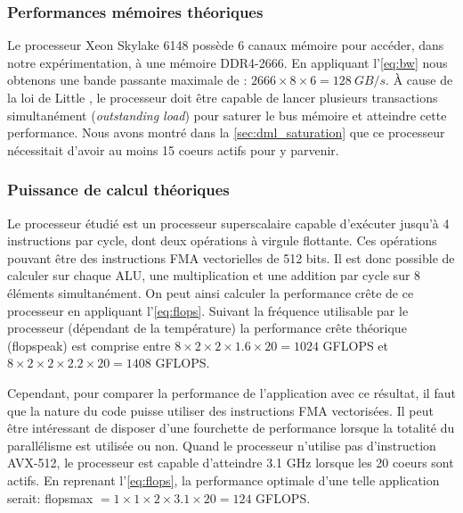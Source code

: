     
    

    \subsubsection{Performances mémoires théoriques}
        Le processeur Xeon Skylake 6148 possède 6 canaux mémoire pour accéder, dans notre expérimentation, à une mémoire DDR4-2666. En appliquant l'\autoref{eq:bw} nous obtenons une bande passante maximale de : $2666 \times 8 \times 6 = 128\ GB/s$. À cause de la loi de Little \cite{little2008little}, le processeur doit être capable de lancer plusieurs transactions simultanément (\textit{outstanding load}) pour saturer le bus mémoire et  atteindre cette performance. Nous avons montré dans la \autoref{sec:dml_saturation} que ce processeur nécessitait d'avoir au moins 15 coeurs actifs pour y parvenir.
        
    

    \subsubsection{Puissance de calcul théoriques}\label{sec:cal_teo_intel_etape1}
        Le processeur étudié est un processeur superscalaire capable d'exécuter jusqu'à 4 instructions par cycle, dont deux opérations à virgule flottante. Ces opérations pouvant être des instructions \gls{FMA} vectorielles de 512 bits. Il est donc possible de calculer sur chaque ALU, une multiplication et une addition par cycle sur 8 éléments simultanément. On peut ainsi calculer la performance crête de ce processeur en appliquant l'\autoref{eq:flops}. Suivant la fréquence utilisable par le processeur (dépendant de la température) la performance crête théorique (\gls{flopspeak}) est comprise entre $8 \times 2 \times 2 \times 1.6 \times 20 = 1024$ GFLOPS et  $8 \times 2 \times 2 \times 2.2 \times 20 = 1408$ GFLOPS. 
        
        Cependant, pour comparer la performance de l'application avec ce résultat, il faut que la nature du code puisse utiliser des instructions FMA vectorisées. Il peut être intéressant de disposer d'une fourchette de performance lorsque la totalité du parallélisme est utilisée ou non. Quand le processeur n'utilise pas d'instruction AVX-512, le processeur est capable d'atteindre 3.1 GHz lorsque les 20 coeurs sont actifs. En reprenant l'\autoref{eq:flops}, la performance optimale d'une telle application serait: \gls{flopsmax} $= 1 \times 1 \times 2 \times 3.1 \times 20 = 124$ GFLOPS.
    

